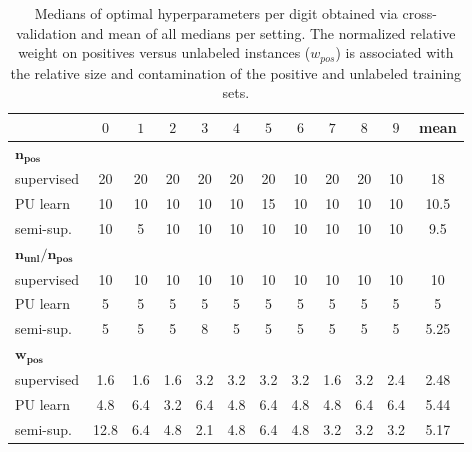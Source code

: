 \begin{table}[!h]
\centering
\begin{tabular}{lccccccccccc}
\toprule
 & $0$ & $1$ & $2$ & $3$ & $4$ & $5$ & $6$ & $7$ & $8$ & $9$ & mean \\
\midrule
$\mathbf{n_{pos}}$ \\
supervised &   20 &   20 &   20 &   20 &   20 &   20 &   10 &   20 &   20 &   10 &   18 \\
PU learn &   10 &   10 &   10 &   10 &   10 &   15 &   10 &   10 &   10 &   10 &   10.5 \\
semi-sup. &   10 &    5 &   10 &   10 &   10 &   10 &   10 &   10 &   10 &   10 &   9.5 \\
$\mathbf{n_{unl}/n_{pos}}$ \\
supervised  &   10 &   10 &   10 &   10 &   10 &   10 &   10 &   10 &   10 &   10 &   10 \\
PU learn &    5 &    5 &    5 &    5 &    5 &    5 &    5 &    5 &    5 &    5 &    5 \\
semi-sup.  &    5 &    5 &    5 &    8 &    5 &    5 &    5 &    5 &    5 &    5 & 5.25  \\
$\mathbf{w_{pos}}$ \\
supervised  &  1.6 &  1.6 &  1.6 &  3.2 &  3.2 &  3.2 &  3.2 &  1.6 &  3.2 &  2.4 &  2.48 \\
PU learn &  4.8 &  6.4 &  3.2 &  6.4 &  4.8 &  6.4 &  4.8 &  4.8 &  6.4 &  6.4 &  5.44 \\
semi-sup.  & 12.8 &  6.4 &  4.8 &  2.1 &  4.8 &  6.4 &  4.8 &  3.2 &  3.2 &  3.2 &  5.17 \\
\bottomrule
\end{tabular}
\caption{Medians of optimal hyperparameters per digit obtained via cross-validation and mean of all medians per setting. The normalized relative weight on positives versus unlabeled instances ($w_{pos}$) is associated with the relative size and contamination of the positive and unlabeled training sets.}
\label{table:hyperparameters}
\end{table}

